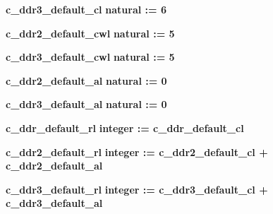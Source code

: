 \begin{DoxyCompactItemize}
{\bf c\+\_\+ddr3\+\_\+default\+\_\+cl} {\bfseries \textcolor{comment}{natural}\textcolor{vhdlchar}{ }\textcolor{vhdlchar}{ }\textcolor{vhdlchar}{\+:}\textcolor{vhdlchar}{=}\textcolor{vhdlchar}{ }\textcolor{vhdlchar}{ } \textcolor{vhdldigit}{6} \textcolor{vhdlchar}{ }} 
\item 
{\bf c\+\_\+ddr2\+\_\+default\+\_\+cwl} {\bfseries \textcolor{comment}{natural}\textcolor{vhdlchar}{ }\textcolor{vhdlchar}{ }\textcolor{vhdlchar}{\+:}\textcolor{vhdlchar}{=}\textcolor{vhdlchar}{ }\textcolor{vhdlchar}{ } \textcolor{vhdldigit}{5} \textcolor{vhdlchar}{ }} 
\item 
{\bf c\+\_\+ddr3\+\_\+default\+\_\+cwl} {\bfseries \textcolor{comment}{natural}\textcolor{vhdlchar}{ }\textcolor{vhdlchar}{ }\textcolor{vhdlchar}{\+:}\textcolor{vhdlchar}{=}\textcolor{vhdlchar}{ }\textcolor{vhdlchar}{ } \textcolor{vhdldigit}{5} \textcolor{vhdlchar}{ }} 
\item 
{\bf c\+\_\+ddr2\+\_\+default\+\_\+al} {\bfseries \textcolor{comment}{natural}\textcolor{vhdlchar}{ }\textcolor{vhdlchar}{ }\textcolor{vhdlchar}{\+:}\textcolor{vhdlchar}{=}\textcolor{vhdlchar}{ }\textcolor{vhdlchar}{ } \textcolor{vhdldigit}{0} \textcolor{vhdlchar}{ }} 
\item 
{\bf c\+\_\+ddr3\+\_\+default\+\_\+al} {\bfseries \textcolor{comment}{natural}\textcolor{vhdlchar}{ }\textcolor{vhdlchar}{ }\textcolor{vhdlchar}{\+:}\textcolor{vhdlchar}{=}\textcolor{vhdlchar}{ }\textcolor{vhdlchar}{ } \textcolor{vhdldigit}{0} \textcolor{vhdlchar}{ }} 
\item 
{\bf c\+\_\+ddr\+\_\+default\+\_\+rl} {\bfseries \textcolor{comment}{integer}\textcolor{vhdlchar}{ }\textcolor{vhdlchar}{ }\textcolor{vhdlchar}{\+:}\textcolor{vhdlchar}{=}\textcolor{vhdlchar}{ }\textcolor{vhdlchar}{ }\textcolor{vhdlchar}{ }\textcolor{vhdlchar}{ }{\bfseries {\bf c\+\_\+ddr\+\_\+default\+\_\+cl}} \textcolor{vhdlchar}{ }} 
\item 
{\bf c\+\_\+ddr2\+\_\+default\+\_\+rl} {\bfseries \textcolor{comment}{integer}\textcolor{vhdlchar}{ }\textcolor{vhdlchar}{ }\textcolor{vhdlchar}{\+:}\textcolor{vhdlchar}{=}\textcolor{vhdlchar}{ }\textcolor{vhdlchar}{ }\textcolor{vhdlchar}{ }\textcolor{vhdlchar}{ }{\bfseries {\bf c\+\_\+ddr2\+\_\+default\+\_\+cl}} \textcolor{vhdlchar}{+}\textcolor{vhdlchar}{ }\textcolor{vhdlchar}{ }\textcolor{vhdlchar}{ }{\bfseries {\bf c\+\_\+ddr2\+\_\+default\+\_\+al}} \textcolor{vhdlchar}{ }} 
\item 
{\bf c\+\_\+ddr3\+\_\+default\+\_\+rl} {\bfseries \textcolor{comment}{integer}\textcolor{vhdlchar}{ }\textcolor{vhdlchar}{ }\textcolor{vhdlchar}{\+:}\textcolor{vhdlchar}{=}\textcolor{vhdlchar}{ }\textcolor{vhdlchar}{ }\textcolor{vhdlchar}{ }\textcolor{vhdlchar}{ }{\bfseries {\bf c\+\_\+ddr3\+\_\+default\+\_\+cl}} \textcolor{vhdlchar}{+}\textcolor{vhdlchar}{ }\textcolor{vhdlchar}{ }\textcolor{vhdlchar}{ }{\bfseries {\bf c\+\_\+ddr3\+\_\+default\+\_\+al}} \textcolor{vhdlchar}{ }} 

\end{DoxyCompactItemize}
